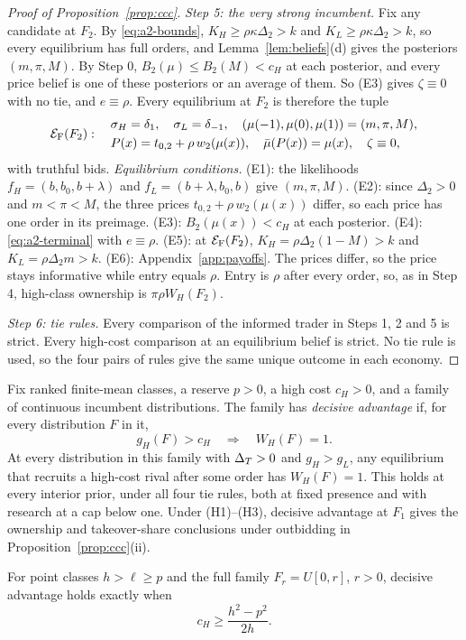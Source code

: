 \begin{proof}[Proof of Proposition~\ref{prop:ccc}]
\emph{Step 5: the very strong incumbent.} Fix any candidate at \(F_2\). By \eqref{eq:a2-bounds},
\(K_H\ge\rho\kappa\Delta_2>k\) and \(K_L\ge\rho\kappa\Delta_2>k\), so every equilibrium has full orders, and
Lemma~\ref{lem:beliefs}(d) gives the posteriors \((m,\pi,M)\). By Step 0, \(B_2(\mu)\le B_2(M)<c_H\) at each
posterior, and every price belief is one of these posteriors or an average of them. So (E3) gives
\(\zeta\equiv0\) with no tie, and \(e\equiv\rho\). Every equilibrium at \(F_2\) is therefore the tuple
\[
\mathcal E_{\rm F}(F_2):\quad
\begin{aligned}
&\sigma_H=\delta_1,\quad \sigma_L=\delta_{-1},\quad (\mu(-1),\mu(0),\mu(1))=(m,\pi,M),\\
&P(x)=t_{0,2}+\rho\,w_2(\mu(x)),\quad \bar\mu(P(x))=\mu(x),\quad \zeta\equiv0,
\end{aligned}
\]
with truthful bids. \emph{Equilibrium conditions.} (E1): the likelihoods \(f_H=(b,b_0,b+\lambda)\) and \(f_L=(b+\lambda,b_0,b)\)
give \((m,\pi,M)\). (E2): since \(\Delta_2>0\) and \(m<\pi<M\), the three
prices \(t_{0,2}+\rho\,w_2(\mu(x))\) differ, so each price has one order in its preimage. (E3): \(B_2(\mu(x))<c_H\)
at each posterior. (E4): \eqref{eq:a2-terminal} with \(e\equiv\rho\). (E5): at \(\mathcal E_{\rm F}(F_2)\),
\(K_H=\rho\Delta_2(1-M)>k\) and \(K_L=\rho\Delta_2m>k\). (E6): Appendix~\ref{app:payoffs}. The prices differ, so the
price stays informative while entry equals \(\rho\). Entry is \(\rho\) after every order, so, as in Step 4,
high-class ownership is \(\pi\rho W_H(F_2)\).

\emph{Step 6: tie rules.} Every comparison of the informed trader in Steps 1, 2 and 5 is strict. Every high-cost comparison at an
equilibrium belief is strict. No tie rule is used, so the four pairs of rules give the same unique outcome in each
economy.
\end{proof}

\begin{lemma}\label{lem:decisive}
Fix ranked finite-mean classes, a reserve \(p>0\), a high cost \(c_H>0\), and a family of continuous incumbent
distributions. The family has \emph{decisive advantage} if, for every distribution \(F\) in it,
\[
g_H(F)>c_H\quad\Longrightarrow\quad W_H(F)=1.
\]
At every distribution in this family with \(\Delta_T>0\) and \(g_H>g_L\), any equilibrium that recruits a high-cost rival
after some order has \(W_H(F)=1\). This holds at every interior prior, under all four tie rules, both at fixed
presence and with research at a cap below one. Under (H1)--(H3), decisive advantage at \(F_1\) gives the
ownership and takeover-share conclusions under outbidding in Proposition~\ref{prop:ccc}(ii).

For point classes \(h>\ell\ge p\) and the full family \(F_r=U[0,r]\), \(r>0\), decisive advantage holds exactly
when
\[
c_H\ge\frac{h^2-p^2}{2h}.
\]
\end{lemma}

